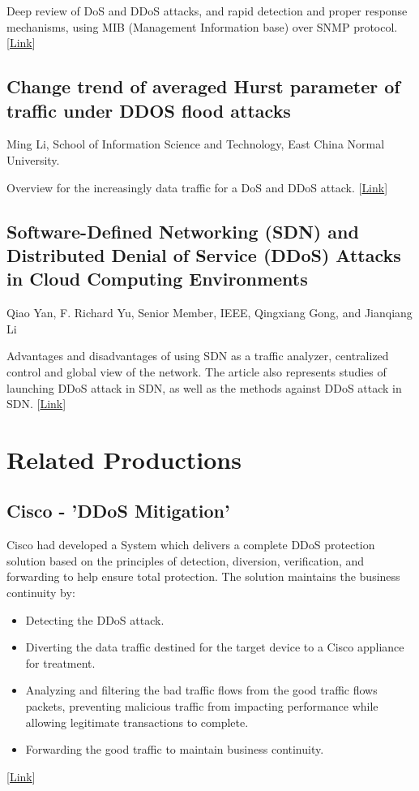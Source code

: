 \documentclass{report}
\begin{document}
Deep review of DoS and DDoS attacks, and rapid detection and proper response mechanisms, using MIB (Management Information base) over SNMP protocol.
[\href{http://www.sciencedirect.com/science/article/pii/S0140366408005094}{Link}]
  \hfill \break

\subsection {Change trend of averaged Hurst parameter of traffic under DDOS flood attacks}
 {\footnotesize Ming Li, School of Information Science and Technology, East China Normal University.}

Overview for the increasingly data traffic for a DoS and DDoS attack.
[\href{http://www.sciencedirect.com/science/article/pii/S0167404805001963}{Link}]
\hfill \break

\subsection{Software-Defined Networking (SDN) and Distributed Denial of Service (DDoS) Attacks in Cloud Computing Environments }
{\footnotesize Qiao Yan, F. Richard Yu, Senior Member, IEEE, Qingxiang Gong, and Jianqiang Li }

Advantages and disadvantages of using SDN as a traffic analyzer, centralized control and global view of the network. The article also represents studies of launching DDoS attack in SDN, as well as the methods against DDoS attack in SDN.
[\href{http://ieeexplore.ieee.org/abstract/document/7289347}{Link}]
\newpage
\section {Related Productions}
 \hfill \break
\subsection {Cisco - 'DDoS Mitigation'}
Cisco had developed a System which delivers a complete DDoS protection solution based on the principles of detection, diversion, verification, and forwarding to help ensure total protection. The solution maintains the business continuity by: 
\begin{itemize}
\item Detecting the DDoS attack.
\item Diverting  the data traffic destined for the target device to  a Cisco appliance for treatment.
\item Analyzing and filtering  the bad traffic flows from the good traffic flows packets, preventing malicious traffic from impacting performance while allowing legitimate transactions to complete.
\item Forwarding  the good traffic to maintain business continuity.
\end{itemize}
[\href{https://www.cisco.com/c/en/us/products/collateral/security/traffic-anomaly-detector-xt-5600a/prod_white_paper0900aecd8011e927.pdf}{Link}]
  \hfill \break
\end{document}
